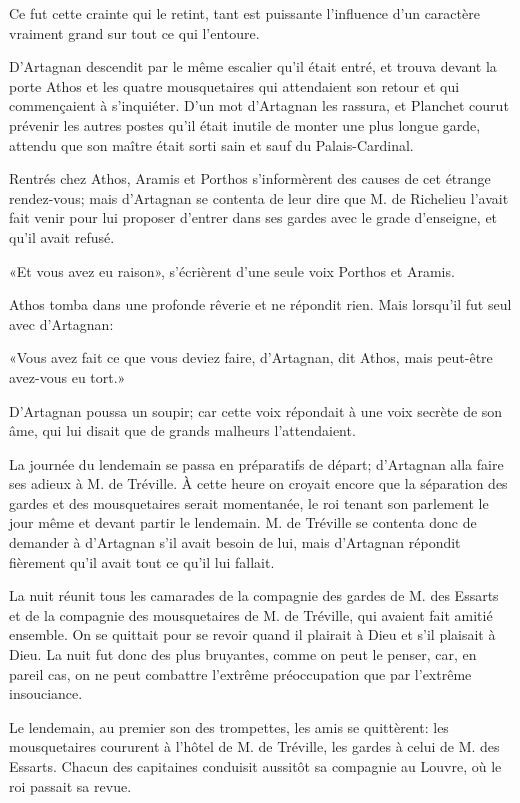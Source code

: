 Ce fut cette crainte qui le retint, tant est puissante l'influence d'un caractère vraiment grand sur tout ce qui l'entoure. 

D'Artagnan descendit par le même escalier qu'il était entré, et trouva devant la porte Athos et les quatre mousquetaires qui attendaient son retour et qui commençaient à s'inquiéter. D'un mot d'Artagnan les rassura, et Planchet courut prévenir les autres postes qu'il était inutile de monter une plus longue garde, attendu que son maître était sorti sain et sauf du Palais-Cardinal. 

Rentrés chez Athos, Aramis et Porthos s'informèrent des causes de cet étrange rendez-vous; mais d'Artagnan se contenta de leur dire que M. de Richelieu l'avait fait venir pour lui proposer d'entrer dans ses gardes avec le grade d'enseigne, et qu'il avait refusé. 

«Et vous avez eu raison», s'écrièrent d'une seule voix Porthos et Aramis. 

Athos tomba dans une profonde rêverie et ne répondit rien. Mais lorsqu'il fut seul avec d'Artagnan: 

«Vous avez fait ce que vous deviez faire, d'Artagnan, dit Athos, mais peut-être avez-vous eu tort.» 

D'Artagnan poussa un soupir; car cette voix répondait à une voix secrète de son âme, qui lui disait que de grands malheurs l'attendaient. 

La journée du lendemain se passa en préparatifs de départ; d'Artagnan alla faire ses adieux à M. de Tréville. À cette heure on croyait encore que la séparation des gardes et des mousquetaires serait momentanée, le roi tenant son parlement le jour même et devant partir le lendemain. M. de Tréville se contenta donc de demander à d'Artagnan s'il avait besoin de lui, mais d'Artagnan répondit fièrement qu'il avait tout ce qu'il lui fallait. 

La nuit réunit tous les camarades de la compagnie des gardes de M. des Essarts et de la compagnie des mousquetaires de M. de Tréville, qui avaient fait amitié ensemble. On se quittait pour se revoir quand il plairait à Dieu et s'il plaisait à Dieu. La nuit fut donc des plus bruyantes, comme on peut le penser, car, en pareil cas, on ne peut combattre l'extrême préoccupation que par l'extrême insouciance. 

Le lendemain, au premier son des trompettes, les amis se quittèrent: les mousquetaires coururent à l'hôtel de M. de Tréville, les gardes à celui de M. des Essarts. Chacun des capitaines conduisit aussitôt sa compagnie au Louvre, où le roi passait sa revue. 

